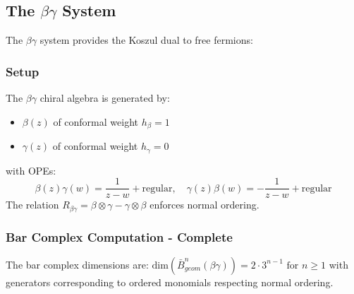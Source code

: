 \subsection{The $\beta\gamma$ System}
 
The $\beta\gamma$ system provides the Koszul dual to free fermions:
 
\subsubsection{Setup}
 
\begin{definition}
The $\beta\gamma$ chiral algebra is generated by:
\begin{itemize}
\item $\beta(z)$ of conformal weight $h_\beta = 1$
\item $\gamma(z)$ of conformal weight $h_\gamma = 0$
\end{itemize}
with OPEs:
\[
\beta(z)\gamma(w) = \frac{1}{z-w} + \text{regular}, \quad 
\gamma(z)\beta(w) = -\frac{1}{z-w} + \text{regular}
\]
The relation $R_{\beta\gamma} = \beta \otimes \gamma - \gamma \otimes \beta$ enforces normal ordering.
\end{definition}
 
\subsubsection{Bar Complex Computation - Complete}

\begin{theorem}
The bar complex dimensions are:
$\text{dim}(\bar{B}^n_{geom}(\beta\gamma)) = 2 \cdot 3^{n-1} \text{ for } n \geq 1$
with generators corresponding to ordered monomials respecting normal ordering.
\end{theorem}

